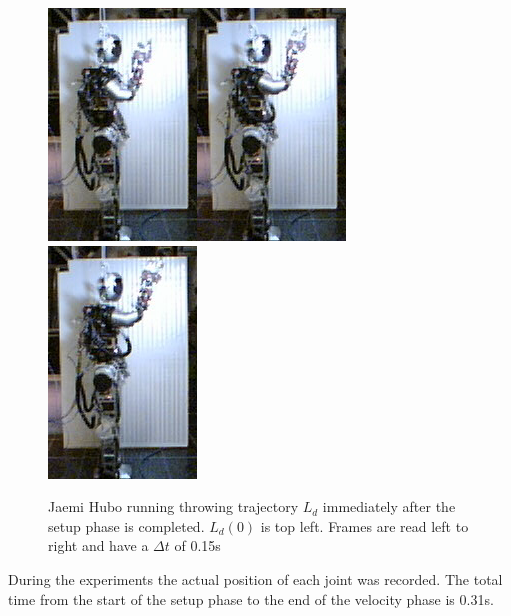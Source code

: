 \begin{figure}[thpb]
\includegraphics[width=0.25\columnwidth]{./pictures/slowMotion/5.png}\includegraphics[width=0.25\columnwidth]{./pictures/slowMotion/6.png}\includegraphics[width=0.25\columnwidth]{./pictures/slowMotion/7.png}
  \caption{Jaemi Hubo running throwing trajectory $L_d$ immediately after the setup phase is completed.  $L_d(0)$ is top left.  Frames are read left to right and have a $\Delta t$ of 0.15s}
  \label{fig:3dThrowReal}
\end{figure}

During the experiments the actual position of each joint was recorded.  The total time from the start of the setup phase to the end of the velocity phase is 0.31s.

